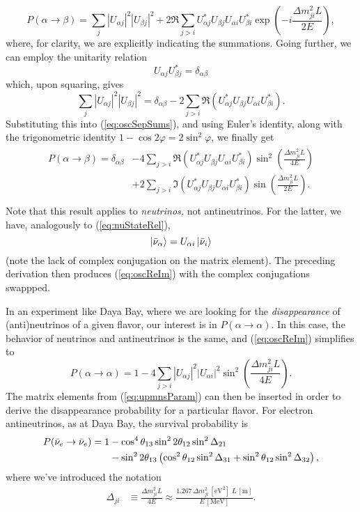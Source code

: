 \documentclass[../thesis.tex]{subfiles}
\begin{document}
\begin{equation}
  \label{eq:oscSepSums}
P(\alpha \rightarrow \beta) = \sum_{j} |U_{\alpha j}|^2 |U_{\beta j}|^2
  + 2 \Re \sum_{j>i} U^*_{\alpha j} U_{\beta j} U_{\alpha i} U^*_{\beta i}
  \exp\left( -i \frac{\Delta m^2_{ji}L}{2E} \right),
\end{equation}
where, for clarity, we are explicitly indicating the summations. Going further, we can employ the unitarity relation
\[U_{\alpha j} U^*_{\beta j} = \delta_{\alpha \beta}\]
which, upon squaring, gives
\[ \sum_j |U_{\alpha j}|^2 |U_{\beta j}|^2 = \delta_{\alpha \beta} -
  2 \sum_{j > i} \Re(U^*_{\alpha j} U_{\beta j} U_{\alpha i} U^*_{\beta i}).\]
Substituting this into (\ref{eq:oscSepSums}), and using Euler's identity, along with the trigonometric identity $1 - \cos 2\varphi = 2\sin^2 \varphi$, we finally get
\begin{align}
  \label{eq:oscReIm}
  \begin{split}
    P(\alpha \rightarrow \beta) = \delta_{\alpha \beta}
    &- 4\sum_{j > i} \Re(U^*_{\alpha j} U_{\beta j} U_{\alpha i} U^*_{\beta i})
    \sin^2 \left( \frac{\Delta m^2_{ji}L}{4E} \right) \\
    &+ 2\sum_{j > i} \Im(U^*_{\alpha j} U_{\beta j} U_{\alpha i} U^*_{\beta i})
    \sin \left( \frac{\Delta m^2_{ji}L}{2E} \right). \\
  \end{split}
\end{align}
Note that this result applies to \emph{neutrinos,} not antineutrinos. For the latter, we have, analogously to (\ref{eq:nuStateRel}),
\[\ket{\bar\nu_\alpha} = U_{\alpha i}\ket{\bar\nu_i}\]
(note the lack of complex conjugation on the matrix element). The preceding derivation then produces (\ref{eq:oscReIm}) with the complex conjugations swappped.

In an experiment like Daya Bay, where we are looking for the \emph{disappearance} of (anti)neutrinos of a given flavor, our interest is in $P(\alpha \rightarrow \alpha)$. In this case, the behavior of neutrinos and antineutrinos is the same, and (\ref{eq:oscReIm}) simplifies to
\[P(\alpha \rightarrow \alpha) = 1 - 4 \sum_{j>i} |U_{\alpha j}|^2 |U_{\alpha i}|^2
\sin^2\left( \frac{\Delta m^2_{ji} L}{4E} \right). \]
The matrix elements from (\ref{eq:upmnsParam}) can then be inserted in order to derive the disappearance probability for a particular flavor. For electron antineutrinos, as at Daya Bay, the survival probability is
\begin{align}
  \label{eq:survProbDybFull}
  \begin{split}
    P(\bar\nu_e \rightarrow \bar\nu_e) =
    1 &- \cos^4\theta_{13}\sin^2 2\theta_{12} \sin^2 \Delta_{21} \\
    &- \sin^2 2\theta_{13}\left( \cos^2\theta_{12} \sin^2 \Delta_{31}
    + \sin^2\theta_{12} \sin^2 \Delta_{32}\right),
  \end{split}
\end{align}
where we've introduced the notation
\begin{align*}
  \Delta_{ji} &\equiv \frac{\Delta m^2_{ji}L}{4E}
                \approx \frac{1.267\, \Delta m^2_{ji}\,\mathrm{[eV^2]}\;
                L\,\mathrm{[m]}}{E\,\mathrm{[MeV]}}.
\end{align*}
\end{document}
